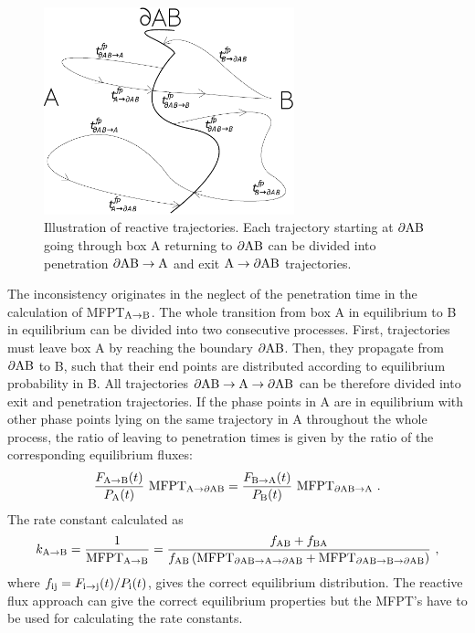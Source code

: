 \begin{figure}[h]
\centering
\includegraphics[height=6cm]{Images/diagAtoBtoA.pdf}
\caption[Reactive trajectories for a reversible transition.]{Illustration of reactive trajectories. Each trajectory starting at ${\rm \partial AB}$ going through box A returning to ${\rm \partial AB}$ can be divided into penetration ${\rm \partial AB \rightarrow A}$ and exit ${\rm A \rightarrow \partial AB}$ trajectories.}
\label{fig:rev-trajs}
\end{figure}

The inconsistency originates in the neglect of the penetration time in the calculation of MFPT$_{\rm A \rightarrow B}$.
The whole transition from box A in equilibrium to B in equilibrium can be divided into two consecutive processes.
First, trajectories must leave box A by reaching the boundary ${\rm \partial AB}$.
Then, they propagate from ${\rm \partial AB}$ to B, such that their end points are distributed according to equilibrium probability in B.
All trajectories ${\rm \partial AB \rightarrow A \rightarrow \partial AB}$ can be therefore divided into exit and penetration trajectories.
If the phase points in A are in equilibrium with other phase points lying on the same trajectory in A throughout the whole process, the ratio of leaving to penetration times is given by the ratio of the corresponding equilibrium fluxes:
\begin{equation}
\label{eq:leave-penetrate}
\frac{F_{\rm A \rightarrow B}(t)}{P_{\rm A}(t)} ~ {\rm MFPT_{\rm A \rightarrow \partial AB}}  
= \frac{F_{\rm B \rightarrow A}(t)}{P_{\rm B}(t)} ~ {\rm MFPT_{\rm \partial AB \rightarrow A}} ~.
\end{equation}
The rate constant calculated as 
\begin{equation}
\label{eq:corrected}
k_{\rm A \rightarrow B} = \frac{1}{\rm MFPT_{\rm A \rightarrow B}} = 
\frac{f_{\rm AB} + f_{\rm BA}}{f_{\rm AB} \left( \rm MFPT_{\rm \partial AB \rightarrow A \rightarrow \partial AB}  + MFPT_{\rm \partial AB \rightarrow B \rightarrow \partial AB} \right) }
~,
\end{equation}
where $f_{\rm ij} = F_{\rm i \rightarrow j}(t) / P_{\rm i}(t)$, gives the correct equilibrium distribution.
The reactive flux approach can give the correct equilibrium properties but the MFPT's have to be used for calculating the rate constants. 


